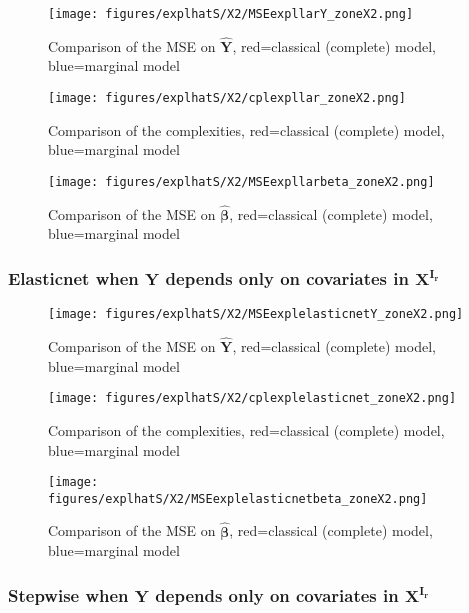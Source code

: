 \documentclass[12pt,a4paper]{report}
\begin{document}
	\begin{figure}[h!]
	\centering
		  \texttt{[image: figures/explhatS/X2/MSEexpllarY\_zoneX2.png]}
		\caption{Comparison of the MSE on $\hat{\boldsymbol{Y}}$, red=classical (complete) model, blue=marginal model}\label{MSEexpllarY_zoneX2}
	\end{figure}
	\begin{figure}[h!]
	\centering
		  \texttt{[image: figures/explhatS/X2/cplexpllar\_zoneX2.png]}
		\caption{Comparison of the complexities, red=classical (complete) model, blue=marginal model}\label{cplexpllar_zoneX2}
	\end{figure}
	\begin{figure}[h!]
	\centering
		  \texttt{[image: figures/explhatS/X2/MSEexpllarbeta\_zoneX2.png]}
		\caption{Comparison of the MSE on $\hat{\boldsymbol{\beta}}$, red=classical (complete) model, blue=marginal model}\label{MSEexpllarbeta_zoneX2}
	\end{figure}
	\FloatBarrier
\newpage
\subsubsection{Elasticnet when $\boldsymbol{Y}$ depends only on covariates in $\boldsymbol{X^{I_r}}$}

	\begin{figure}[h!]
	\centering
		  \texttt{[image: figures/explhatS/X2/MSEexplelasticnetY\_zoneX2.png]}
		\caption{Comparison of the MSE on $\hat{\boldsymbol{Y}}$, red=classical (complete) model, blue=marginal model}\label{MSEexplelasticnetY_zoneX2}
	\end{figure}
	\begin{figure}[h!]
	\centering
		  \texttt{[image: figures/explhatS/X2/cplexplelasticnet\_zoneX2.png]}
		\caption{Comparison of the complexities, red=classical (complete) model, blue=marginal model}\label{cplexplelasticnet_zoneX2}
	\end{figure}
	\begin{figure}[h!]
	\centering
		  \texttt{[image: figures/explhatS/X2/MSEexplelasticnetbeta\_zoneX2.png]}
		\caption{Comparison of the MSE on $\hat{\boldsymbol{\beta}}$, red=classical (complete) model, blue=marginal model}\label{MSEexplelasticnetbeta_zoneX2}
	\end{figure}
	\FloatBarrier
\newpage
\subsubsection{Stepwise when $\boldsymbol{Y}$ depends only on covariates in $\boldsymbol{X^{I_r}}$}
\end{document}
